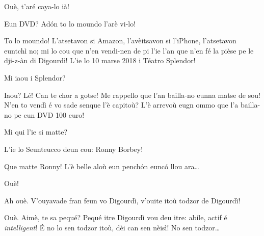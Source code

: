 \begin{drama}
\Paganspeaks Ouè, t'aré caya-lo ià!

\Nevaousaspeaks Eun DVD? Ad\'on to lo moundo l'arè vi-lo!

\Paganspeaks To lo moundo! L'atsetavon si Amazon, l'avèitsavon si l'iPhone, l'atsetavon euntchì no; mi lo cou que n'en vendi-nen de pi l'ie l'an que n'en fé la pièse pe le dji-z-àn di Digourdì! L'ie lo 10 marse 2018 i Téatro Splendor!

\Nevaouspeaks Mi iaou i Splendor?

\Paganspeaks Iaou?  Lé! Can te chor a gotse! Me rappello que l'an bailla-no eunna matse de sou! N'en to vendì é vo sade senque l'è capitoù? L'è arrevoù eugn ommo que l'a bailla-no pe eun DVD 100 euro!

\Nevaousaspeaks Mi qui l'ie si matte?

\Maganspeaks L'ie lo Seunteucco deun cou: Ronny Borbey!

\Paganspeaks Que matte Ronny! L'è belle aloù eun pench\'on euncó llou ara\ldots

\Maganspeaks Ouè!

\Nevaouspeaks Ah ouè. V'ouyavade fran feun vo Digourdì, v'ouite itoù todzor de Digourdì!

\Paganspeaks Ouè. Aimè, te sa pequé? Pequé itre Digourdì vou deu itre: abile, actif é \textit{intelligent}! \'E no lo sen todzor itoù, dèi can sen nèisì! No sen todzor\ldots 


\ridocliou

\DeriLeRido




\end{drama}
